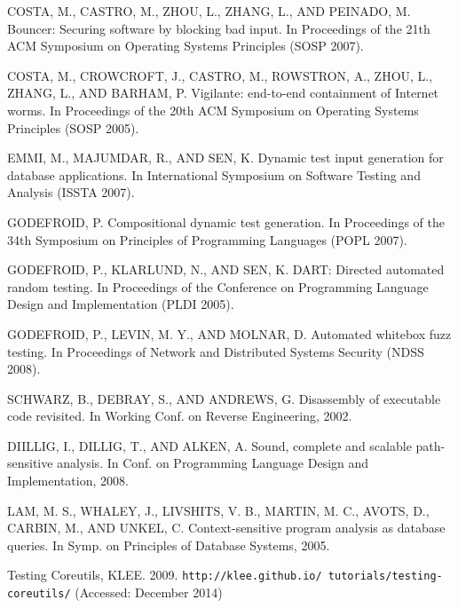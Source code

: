 \documentclass[conference]{IEEEtran}
\begin{document}
\begin{thebibliography}{1}
COSTA, M., CASTRO, M., ZHOU, L., ZHANG, L., AND PEINADO, M. Bouncer: Securing software by blocking bad input. In Proceedings of the 21th ACM Symposium on Operating Systems Principles (SOSP 2007).

COSTA, M., CROWCROFT, J., CASTRO, M., ROWSTRON, A., ZHOU, L., ZHANG, L., AND BARHAM, P. Vigilante: end-to-end containment of Internet worms. In Proceedings of the 20th ACM Symposium on Operating Systems Principles (SOSP 2005).

EMMI, M., MAJUMDAR, R., AND SEN, K. Dynamic test input generation for database applications. In International Symposium on Software Testing and Analysis (ISSTA 2007).

GODEFROID, P. Compositional dynamic test generation. In Proceedings of the 34th Symposium on Principles of Programming Languages (POPL 2007).

GODEFROID, P., KLARLUND, N., AND SEN, K. DART: Directed automated random testing. In Proceedings of the Conference on Programming Language Design and Implementation (PLDI 2005).

GODEFROID, P., LEVIN, M. Y., AND MOLNAR, D. Automated whitebox fuzz testing. In Proceedings of Network and Distributed Systems Security (NDSS 2008).

SCHWARZ, B., DEBRAY, S., AND ANDREWS, G. Disassembly of executable code revisited. In Working Conf. on Reverse Engineering, 2002.

DIILLIG, I., DILLIG, T., AND ALKEN, A. Sound, complete and scalable path- sensitive analysis. In Conf. on Programming Language Design and Implementation, 2008.

LAM, M. S., WHALEY, J., LIVSHITS, V. B., MARTIN, M. C., AVOTS, D., CARBIN, M., AND UNKEL, C. Context-sensitive program analysis as
database queries. In Symp. on Principles of Database Systems, 2005.

Testing Coreutils, KLEE. 2009. {\tt http://klee.github.io/
tutorials/testing-coreutils/} (Accessed: December 2014)

\end{thebibliography}

\end{document}
